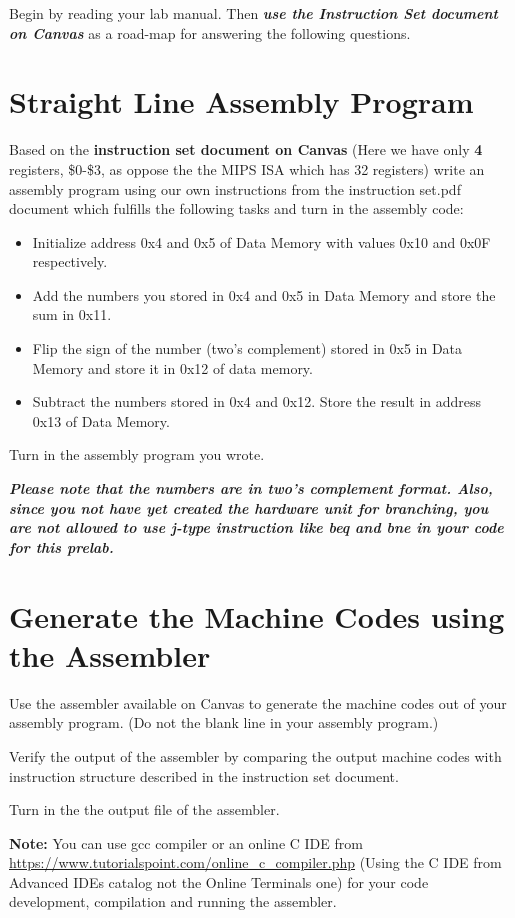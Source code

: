 \documentclass[10pt, oneside]{article}
\begin{document}
\pagestyle{empty}
\noindent
{}

Begin by reading your lab manual. Then \textit{\textbf{use the Instruction Set document on Canvas}} as a road-map for answering the following questions.

\section{Straight Line Assembly Program}\label{sec:asm}

Based on the \textbf{instruction set document on Canvas} (Here we have only \textbf{4} registers, \$0-\$3, as oppose the the MIPS ISA which has 32 registers) write an assembly program using our own instructions from the instruction set.pdf document which fulfills the following tasks and turn in the assembly code:

\begin{itemize}
  \item Initialize address 0x4 and 0x5 of Data Memory with values 0x10 and 0x0F respectively.
  \item Add the numbers you stored in 0x4 and 0x5 in Data Memory and store the sum in 0x11.
	\item Flip the sign of the number (two's complement) stored in 0x5 in Data Memory and store it in 0x12 of data memory.
  \item Subtract the numbers stored in 0x4 and 0x12. Store the result in address 0x13 of Data Memory.
\end{itemize}

Turn in the assembly program you wrote.

\textit{\textbf{Please note that the numbers are in two's complement format. Also, since you not have yet created the hardware unit for branching, you are not allowed to use j-type instruction like beq and bne in your code for this prelab.}}

\section{Generate the Machine Codes using the Assembler}\label{sec:codegen}

Use the assembler available on Canvas to generate the machine codes out of your assembly program. (Do not the blank line in your assembly program.) 

Verify the output of the assembler by comparing the output machine codes with instruction structure described in the instruction set document.

Turn in the the output file of the assembler.

\textbf{Note:} You can use gcc compiler or an online C IDE from \url{https://www.tutorialspoint.com/online_c_compiler.php} (Using the C IDE from Advanced IDEs catalog not the Online Terminals one) for your code development, compilation and running the assembler. 
\end{document}
